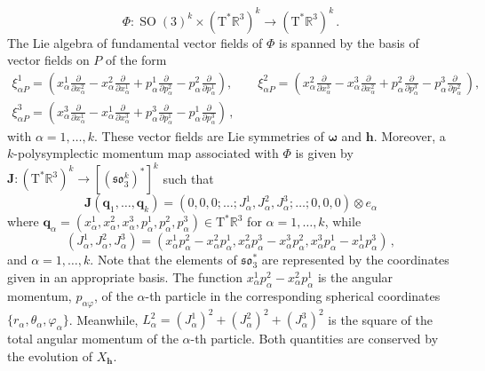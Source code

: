\documentclass[11pt]{article}
\theoremstyle{plain}
\theoremstyle{definition}
\newcommand{\R}{\mathbb{R}}
\newcommand{\T}{\mathrm{T}}
\newcommand{\cT}{\mathrm{T}^\ast}
\newcommand{\parder}[2]{\frac{\partial #1}{\partial #2}}
\DeclareMathOperator{\SO}{SO}
\numberwithin{equation}{section}
\begin{document}
\[
\Phi:\SO(3)^k\times (\cT\R^3)^k\longrightarrow (\cT\R^3)^k\,.
\]
The Lie algebra of fundamental vector fields of $\Phi$ is spanned by the basis of vector fields on $P$ of the form
\begin{gather}
    \xi^1_{\alpha P}= \left(x_\alpha^1\parder{}{x_\alpha^2} - x_\alpha^2\parder{}{x_\alpha^1} + p_\alpha^1\parder{}{p_\alpha^2} - p_\alpha^2\parder{}{p_\alpha^1}\right),\qquad \xi^2_{\alpha P} = \left(x_\alpha^2\parder{}{x_\alpha^3} - x_\alpha^3\parder{}{x_\alpha^2} + p_\alpha^2\parder{}{p_\alpha^3} - p_\alpha^3\parder{}{p_\alpha^2}\,\right),\\
    \xi^3_{\alpha P} = \left(x_\alpha^3\parder{}{x_\alpha^1} - x_\alpha^1\parder{}{x_\alpha^3} + p_\alpha^3\parder{}{p_\alpha^1} - p_\alpha^1\parder{}{p_\alpha^3}\right)\,,
\end{gather}
with $\alpha=1,\ldots,k$. These vector fields are Lie symmetries of $\bm\omega$ and $\bm h$. Moreover, a $k$-polysymplectic momentum map associated with $\Phi$ is given by
$\mathbf{J}:(\cT\mathbb{R}^3)^k\rightarrow [(\mathfrak{so}_3^k)^*]^k$ such that
\begin{equation*}
    \mathbf{J}(\boldsymbol{q}_1,\ldots,\boldsymbol{q}_k)=(0,0,0;\ldots;J_\alpha^1,J_\alpha^2,J_\alpha^3;\ldots;0,0,0)\otimes e_\alpha
\end{equation*}
where $\boldsymbol{q}_\alpha=(x^1_\alpha,x^2_\alpha,x^3_\alpha,p^1_\alpha,p^2_\alpha,p^3_\alpha)\in \T^*\R^3$ for $\alpha=1,\ldots,k$, while 
$$    (J^1_\alpha,J^2_\alpha,J^3_\alpha)=(x_\alpha^1p_\alpha^2 - x_\alpha^2p_\alpha^1, x_\alpha^2p_\alpha^3 - x_\alpha^3p_\alpha^2, x_\alpha^3p_\alpha^1 - x_\alpha^1p_\alpha^3)\,,
$$
and $\alpha=1,\ldots,k$. Note that the elements of $\mathfrak{so}_3^*$ are represented by the coordinates given in an appropriate basis. The function $x_\alpha^1p_\alpha^2 - x_\alpha^2p_\alpha^1$ is the angular momentum, $p_{\alpha\varphi}$, of the $\alpha$-th particle in the corresponding spherical coordinates $\{r_\alpha,\theta_\alpha,\varphi_\alpha\}$. Meanwhile, $L_\alpha^2 = (J_\alpha^1)^2+(J_\alpha^2)^2+(J_\alpha^3)^2$ is the square of the total angular momentum of the $\alpha$-th particle. Both quantities are conserved by the evolution of $X_{\bm h}$. 
\end{document}
